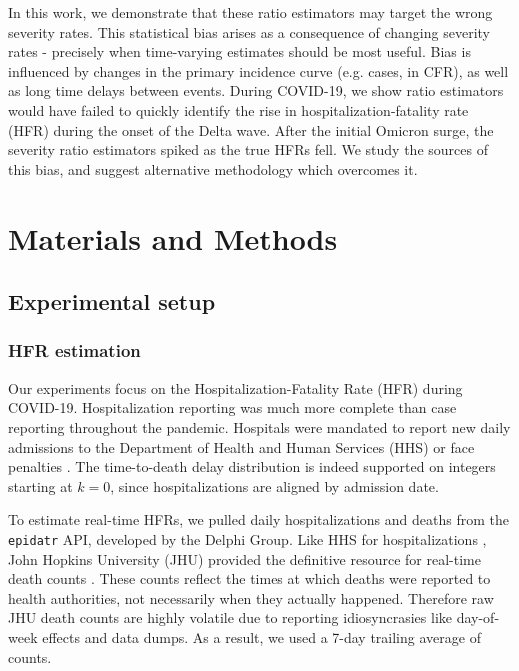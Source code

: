 \documentclass{article}
\begin{document}
In this work, we demonstrate that these ratio estimators may target the wrong severity rates. This statistical bias arises as a consequence of changing severity rates - precisely when time-varying estimates should be most useful. Bias is influenced by changes in the primary incidence curve (e.g. cases, in CFR), as well as long time delays between events. 
During COVID-19, we show ratio estimators would have failed to quickly identify the rise in hospitalization-fatality rate (HFR) during the onset of the Delta wave. After the initial Omicron surge, the severity ratio estimators spiked as the true HFRs fell. We study the sources of this bias, and suggest alternative methodology which overcomes it.


\section{Materials and Methods}\label{sec:methods}

\subsection{Experimental setup}\label{sec:setup}
\subsubsection{HFR estimation}
Our experiments focus on the Hospitalization-Fatality Rate (HFR) during COVID-19. Hospitalization reporting was much more complete than case reporting throughout the pandemic. Hospitals were mandated to report new daily admissions to the Department of Health and Human Services (HHS) or face penalties \citep{HHS2023}. The time-to-death delay distribution is indeed supported on integers starting at $k=0$, since hospitalizations are aligned by admission date.

To estimate real-time HFRs, we pulled daily hospitalizations and deaths from the \texttt{epidatr} API, developed by the Delphi Group. Like HHS for hospitalizations \citep{HHS2023}, John Hopkins University (JHU) provided the definitive resource for real-time death counts \citep{JHUepidatr}. These counts reflect the times at which deaths were reported to health authorities, not necessarily when they actually happened. Therefore raw JHU death counts are highly volatile due to reporting idiosyncrasies like day-of-week effects and data dumps. As a result, we used a 7-day trailing average of counts. 
\end{document}
